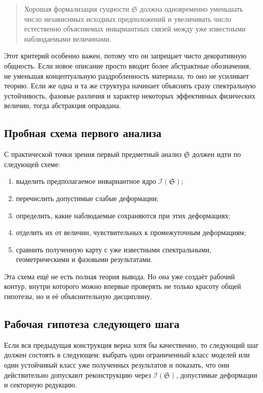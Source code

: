 \documentclass[12pt,a4paper]{article}
\begin{document}
\begin{quote}
Хорошая формализация сущности \(\mathfrak{S}\) должна одновременно уменьшать число независимых исходных предположений и увеличивать число естественно объясняемых инвариантных связей между уже известными наблюдаемыми величинами.
\end{quote}

Этот критерий особенно важен, потому что он запрещает чисто декоративную общность. Если новое описание просто вводит более абстрактные обозначения, не уменьшая концептуальную раздробленность материала, то оно не усиливает теорию. Если же одна и та же структура начинает объяснять сразу спектральную устойчивость, фазовые различия и характер некоторых эффективных физических величин, тогда абстракция оправдана.

\subsection{Пробная схема первого анализа}

С практической точки зрения первый предметный анализ \(\mathfrak{S}\) должен идти по следующей схеме:
\begin{enumerate}
    \item выделить предполагаемое инвариантное ядро \(\mathcal{I}(\mathfrak{S})\);
    \item перечислить допустимые слабые деформации;
    \item определить, какие наблюдаемые сохраняются при этих деформациях;
    \item отделить их от величин, чувствительных к промежуточным деформациям;
    \item сравнить полученную карту с уже известными спектральными, геометрическими и фазовыми результатами.
\end{enumerate}

Эта схема ещё не есть полная теория вывода. Но она уже создаёт рабочий контур, внутри которого можно впервые проверять не только красоту общей гипотезы, но и её объяснительную дисциплину.

\subsection{Рабочая гипотеза следующего шага}

Если вся предыдущая конструкция верна хотя бы качественно, то следующий шаг должен состоять в следующем: выбрать один ограниченный класс моделей или один устойчивый класс уже полученных результатов и показать, что они действительно допускают реконструкцию через \(\mathcal{I}(\mathfrak{S})\), допустимые деформации и секторную редукцию.
\end{document}
